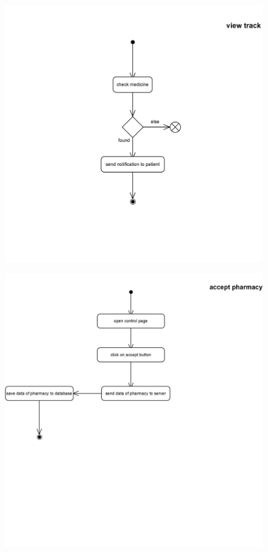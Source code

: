 \documentclass[]{article}
\begin{document}
\begin{figure}[H]
\centering
\includegraphics[scale=0.6]{./activity/14}
\end{figure}
\begin{figure}[H]
\centering
\includegraphics[scale=0.6]{./activity/15}
\end{figure}
\end{document}
